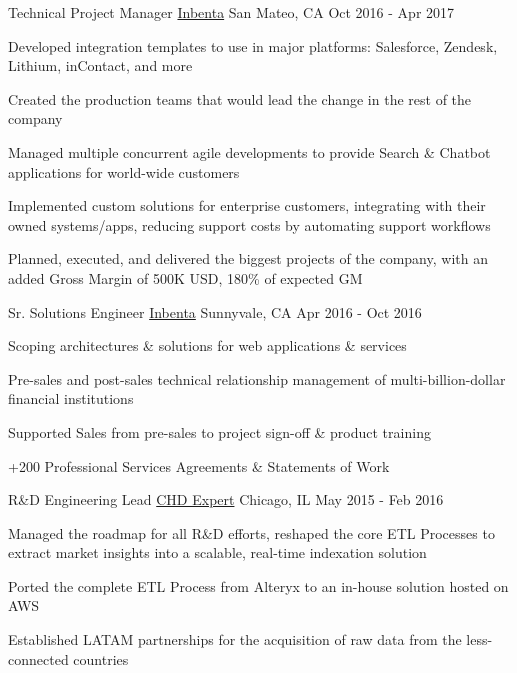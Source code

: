 \begin{cventries}
  \cventry
    {Technical Project Manager} %
    {\href{https://www.inbenta.com}{Inbenta}} %
    {San Mateo, CA} %
    {Oct 2016 - Apr 2017} %
    {
      \begin{cvitems} %
        \item{Developed integration templates to use in major platforms: Salesforce, Zendesk, Lithium, inContact, and more}
        \item {Created the production teams that would lead the change in the rest of the company}
        \item {Managed multiple concurrent agile developments to provide Search \& Chatbot applications for world-wide customers}
        \item {Implemented custom solutions for enterprise customers, integrating with their owned systems/apps, reducing support costs by automating support workflows}
        \item {Planned, executed, and delivered the biggest projects of the company, with an added Gross Margin of 500K USD, 180\% of expected GM}
      \end{cvitems}
    }

  \cventry
    {Sr. Solutions Engineer} %
    {\href{https://www.inbenta.com}{Inbenta}} %
    {Sunnyvale, CA} %
    {Apr 2016 - Oct 2016} %
    {
      \begin{cvitems} %
        \item {Scoping architectures \& solutions for web applications \& services}
        \item {Pre-sales and post-sales technical relationship management of multi-billion-dollar financial institutions}
        \item {Supported Sales from pre-sales to project sign-off \& product training}
        \item {+200 Professional Services Agreements \& Statements of Work}
      \end{cvitems}
    }

  \cventry
    {R\&D Engineering Lead} %
    {\href{https://www.chd-expert.com}{CHD Expert}} %
    {Chicago, IL} %
    {May 2015 - Feb 2016} %
    { 
      \begin{cvitems} %
        \item {Managed the roadmap for all R\&D efforts, reshaped the core ETL Processes to extract market insights into a scalable, real-time indexation solution}
        \item {Ported the complete ETL Process from Alteryx to an in-house solution hosted on AWS}
        \item {Established LATAM partnerships for the acquisition of raw data from the less-connected countries}
      \end{cvitems}
    }
    

\end{cventries}
